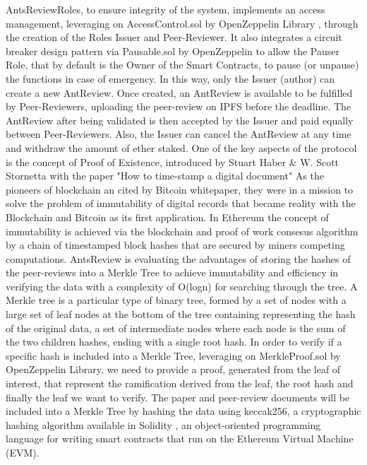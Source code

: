 \documentclass[runningheads]{llncs}
\begin{document}
AntsReviewRoles, to ensure integrity of the system, implements an access management, leveraging on AccessControl.sol by OpenZeppelin Library \cite{OZ}, through the creation of the Roles Issuer and Peer-Reviewer.
\newline It also integrates a circuit breaker design pattern via Pausable.sol by OpenZeppelin to allow the Pauser Role, that by default is the Owner of the Smart Contracts, to pause (or unpause) the functions in case of emergency.
\newline In this way, only the Issuer (author) can create a new AntReview.
\newline Once created, an AntReview is available to be fulfilled by Peer-Reviewers, uploading the peer-review on IPFS before the deadline.
\newline The AntReview after being validated is then accepted by the Issuer and paid equally between Peer-Reviewers.
\newline Also, the Issuer can cancel the AntReview at any time and withdraw the amount of ether staked.
\newline One of the key aspects of the protocol is the concept of Proof of Existence, introduced by Stuart Haber \& W. Scott Stornetta with the paper "How to time-stamp a digital document"\cite{TimeStamp-Haber}
\newline As the pioneers of blockchain an cited by Bitcoin whitepaper, they were in a mission to solve the problem of immutability of digital records that became reality with the Blockchain and Bitcoin \cite{Bitcoin} as its first application.
\newline In Ethereum \cite{Ethereum} the concept of immutability is achieved via the blockchain and proof of work consesus algorithm by a chain of timestamped block hashes that are secured by miners competing computations.
\newline AntsReview is evaluating the advantages of storing the hashes of the peer-reviews into a Merkle Tree \cite{BayerHaber1992} to achieve immutability and efficiency in verifying the data with a complexity of O(logn) for searching through the tree.
\newline A Merkle tree is a particular type of binary tree, formed by a set of nodes with a large set of leaf nodes at the bottom of the tree containing representing the hash of the original data, a set of intermediate nodes where each node is the sum of the two children hashes, ending with a single root hash.
\newline In order to verify if a specific hash is included into a Merkle Tree, leveraging on MerkleProof.sol by OpenZeppelin Library, we need to provide a proof, generated from the leaf of interest, that represent the ramification derived from the leaf, the root hash and finally the leaf we want to verify.
\newline The paper and peer-review documents will be included into a Merkle Tree by hashing the data using keccak256, a cryptographic hashing algorithm available in Solidity \cite{Solidity}, an object-oriented programming language for writing smart contracts that run on the Ethereum Virtual Machine (EVM).
\end{document}
